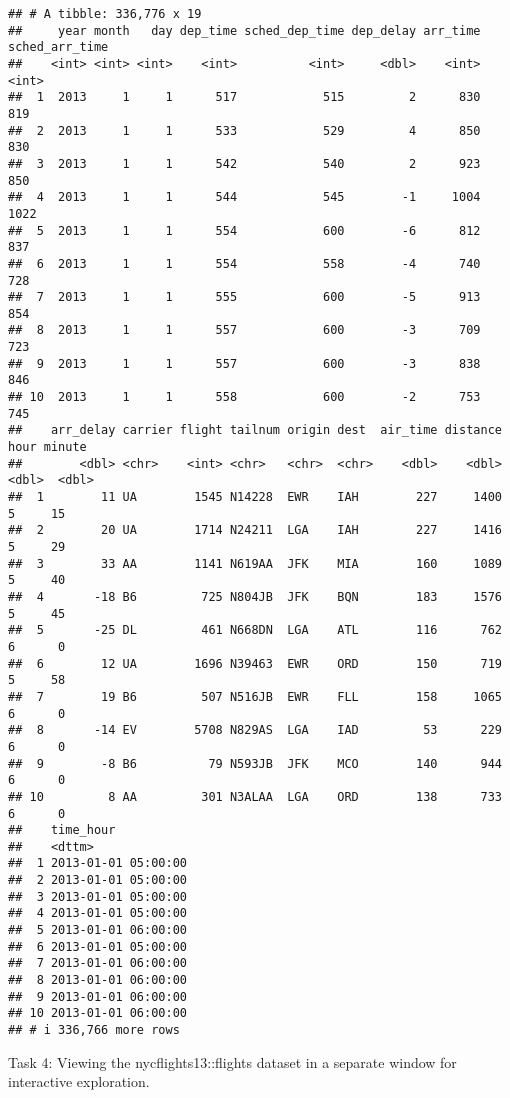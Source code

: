 \documentclass[
]{article}
\begin{document}
\begin{verbatim}
## # A tibble: 336,776 x 19
##     year month   day dep_time sched_dep_time dep_delay arr_time sched_arr_time
##    <int> <int> <int>    <int>          <int>     <dbl>    <int>          <int>
##  1  2013     1     1      517            515         2      830            819
##  2  2013     1     1      533            529         4      850            830
##  3  2013     1     1      542            540         2      923            850
##  4  2013     1     1      544            545        -1     1004           1022
##  5  2013     1     1      554            600        -6      812            837
##  6  2013     1     1      554            558        -4      740            728
##  7  2013     1     1      555            600        -5      913            854
##  8  2013     1     1      557            600        -3      709            723
##  9  2013     1     1      557            600        -3      838            846
## 10  2013     1     1      558            600        -2      753            745
##    arr_delay carrier flight tailnum origin dest  air_time distance  hour minute
##        <dbl> <chr>    <int> <chr>   <chr>  <chr>    <dbl>    <dbl> <dbl>  <dbl>
##  1        11 UA        1545 N14228  EWR    IAH        227     1400     5     15
##  2        20 UA        1714 N24211  LGA    IAH        227     1416     5     29
##  3        33 AA        1141 N619AA  JFK    MIA        160     1089     5     40
##  4       -18 B6         725 N804JB  JFK    BQN        183     1576     5     45
##  5       -25 DL         461 N668DN  LGA    ATL        116      762     6      0
##  6        12 UA        1696 N39463  EWR    ORD        150      719     5     58
##  7        19 B6         507 N516JB  EWR    FLL        158     1065     6      0
##  8       -14 EV        5708 N829AS  LGA    IAD         53      229     6      0
##  9        -8 B6          79 N593JB  JFK    MCO        140      944     6      0
## 10         8 AA         301 N3ALAA  LGA    ORD        138      733     6      0
##    time_hour          
##    <dttm>             
##  1 2013-01-01 05:00:00
##  2 2013-01-01 05:00:00
##  3 2013-01-01 05:00:00
##  4 2013-01-01 05:00:00
##  5 2013-01-01 06:00:00
##  6 2013-01-01 05:00:00
##  7 2013-01-01 06:00:00
##  8 2013-01-01 06:00:00
##  9 2013-01-01 06:00:00
## 10 2013-01-01 06:00:00
## # i 336,766 more rows
\end{verbatim}

Task 4: Viewing the nycflights13::flights dataset in a separate window
for interactive exploration.
\end{document}

